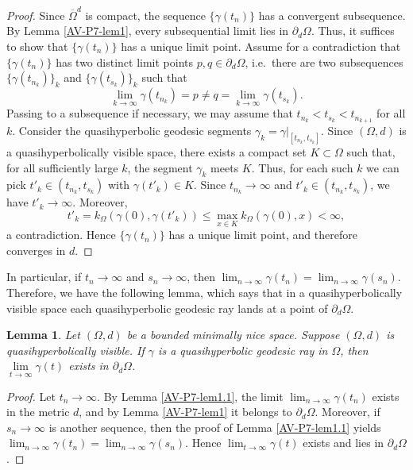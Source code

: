 \documentclass[a4paper,12pt]{amsart}
\newtheorem{lem}[equation]{Lemma}
\theoremstyle{definition}
\begin{document}
\begin{proof}
Since $\overline{\Omega}^d$ is compact, the sequence $\{\gamma(t_n)\}$ has a convergent subsequence. By Lemma \ref{AV-P7-lem1}, every subsequential limit lies in $\partial_d\Omega$.
	Thus, it suffices to show that $\{\gamma(t_n)\}$ has a unique limit point. Assume for a contradiction that $\{\gamma(t_n)\}$ has two distinct limit points $p,q\in \partial_{d}\Omega$, i.e.\ there are two subsequences $\{\gamma(t_{n_{k}})\}_{k}$ and $\{\gamma(t_{s_{k}})\}_{k}$ such that
	\[
	\lim_{k\to \infty}\gamma(t_{n_{k}})=p\neq q= \lim_{k\to \infty}\gamma(t_{s_{k}}).
	\]
	Passing to a subsequence if necessary, we may assume that $t_{n_{k}}<t_{s_{k}}<t_{n_{k+1}}$ for all $k$.
	Consider the quasihyperbolic geodesic segments $\gamma_k=\gamma|_{[t_{n_{k}},t_{s_{k}}]}$. Since $(\Omega,d)$ is a quasihyperbolically visible space, there exists a compact set $K\subset \Omega$ such that, for all sufficiently large $k$, the segment $\gamma_k$ meets $K$.
	Thus, for each such $k$ we can pick $t'_k\in (t_{n_k},t_{s_k})$ with $\gamma(t'_k)\in K$.
Since $t_{n_k}\to\infty$ and $t'_k\in(t_{n_k},t_{s_k})$, we have $t'_k\to\infty$.
	Moreover,
	\[
	t'_k = k_\Omega(\gamma(0),\gamma(t'_k)) \le \max_{x\in K} k_\Omega(\gamma(0),x) < \infty,
	\]
	a contradiction. Hence $\{\gamma(t_n)\}$ has a unique limit point, and therefore converges in $d$.
\end{proof}

In particular, if $t_n\to\infty$ and $s_n\to\infty$, then $\lim_{n\to\infty}\gamma(t_n)=\lim_{n\to\infty}\gamma(s_n)$.
Therefore, we have the following lemma, which says that in a quasihyperbolically visible space each quasihyperbolic geodesic ray lands at a point of $\partial_{d}\Omega$.

\begin{lem}\label{AV-P7-lem2}
	Let $(\Omega,d)$ be a bounded minimally nice space. Suppose $(\Omega,d)$ is quasihyperbolically visible. If $\gamma$ is a quasihyperbolic geodesic ray in $\Omega$, then $\lim\limits_{t\to \infty}\gamma(t)$ exists in $\partial_d\Omega$.
\end{lem}

\begin{proof}
	Let $t_n\to\infty$. By Lemma \ref{AV-P7-lem1.1}, the limit $\lim_{n\to\infty}\gamma(t_n)$ exists in the metric $d$, and by Lemma \ref{AV-P7-lem1} it belongs to $\partial_d\Omega$.
	Moreover, if $s_n\to\infty$ is another sequence, then the proof of Lemma \ref{AV-P7-lem1.1} yields
	$\lim_{n\to\infty}\gamma(t_n)=\lim_{n\to\infty}\gamma(s_n)$.
	Hence $\lim_{t\to\infty}\gamma(t)$ exists and lies in $\partial_d\Omega$.
\end{proof}
\end{document}
